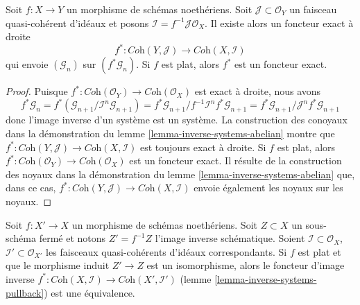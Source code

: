 \begin{lemma}
\label{lemma-inverse-systems-pullback}
Soit $f : X \to Y$ un morphisme de schémas noethériens.
Soit $\mathcal{J} \subset \mathcal{O}_Y$ un faisceau quasi-cohérent
d'idéaux et posons $\mathcal{I} = f^{-1}\mathcal{J} \mathcal{O}_X$.
Il existe alors un foncteur exact à droite
$$
f^* : \textit{Coh}(Y, \mathcal{J}) \longrightarrow \textit{Coh}(X, \mathcal{I})
$$
qui envoie $(\mathcal{G}_n)$ sur $(f^*\mathcal{G}_n)$. Si $f$ est plat,
alors $f^*$ est un foncteur exact.
\end{lemma}

\begin{proof}
Puisque $f^* : \textit{Coh}(\mathcal{O}_Y) \to \textit{Coh}(\mathcal{O}_X)$
est exact à droite, nous avons
$$
f^*\mathcal{G}_n =
f^*(\mathcal{G}_{n + 1}/\mathcal{I}^n\mathcal{G}_{n + 1}) =
f^*\mathcal{G}_{n + 1}/f^{-1}\mathcal{I}^nf^*\mathcal{G}_{n + 1} =
f^*\mathcal{G}_{n + 1}/\mathcal{J}^nf^*\mathcal{G}_{n + 1}
$$
donc l'image inverse d'un système est un système. La construction des
conoyaux dans la démonstration du lemme \ref{lemma-inverse-systems-abelian}
montre que
$f^* : \textit{Coh}(Y, \mathcal{J}) \to \textit{Coh}(X, \mathcal{I})$
est toujours exact à droite. Si $f$ est plat, alors
$f^* : \textit{Coh}(\mathcal{O}_Y) \to \textit{Coh}(\mathcal{O}_X)$
est un foncteur exact. Il résulte de la construction des noyaux
dans la démonstration du lemme \ref{lemma-inverse-systems-abelian}
que, dans ce cas,
$f^* : \textit{Coh}(Y, \mathcal{J}) \to \textit{Coh}(X, \mathcal{I})$
envoie également les noyaux sur les noyaux.
\end{proof}

\begin{lemma}
\label{lemma-inverse-systems-pullback-equivalence}
Soit $f : X' \to X$ un morphisme de schémas noethériens. Soit $Z \subset X$
un sous-schéma fermé et notons $Z' = f^{-1}Z$ l'image inverse
schématique. Soient $\mathcal{I} \subset \mathcal{O}_X$,
$\mathcal{I}' \subset \mathcal{O}_{X'}$ les faisceaux
quasi-cohérents d'idéaux correspondants.
Si $f$ est plat et que le morphisme induit $Z' \to Z$
est un isomorphisme, alors le foncteur d'image inverse
$f^* : \textit{Coh}(X, \mathcal{I}) \to \textit{Coh}(X', \mathcal{I}')$
(lemme \ref{lemma-inverse-systems-pullback})
est une équivalence.
\end{lemma}

